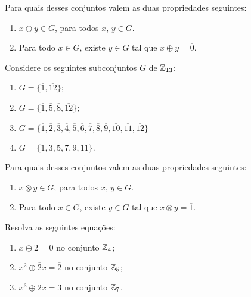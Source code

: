 \documentclass[12pt]{exam}
\begin{document}
    Para quais desses conjuntos valem as duas propriedades seguintes:
    \begin{enumerate}[label=({\roman*})]
        \item $x \oplus y \in G$, para todos $x$, $y \in G$.
        \item Para todo $x \in G$, existe $y \in G$ tal que $x \oplus y = \overline{0}$.
    \end{enumerate}

    \vspace{.3cm}

    \questao{} Considere os seguintes subconjuntos $G$ de $\mathbb{Z}_{13}$:
    \begin{multicols}{2}
        \begin{enumerate}[label=({\alph*})]
            \item $G=\{\overline{1},\overline{12}\}$;

            \item $G=\{\overline{1},\overline{5},\overline{8},\overline{12}\}$;

            \item $G=\{\overline{1},\overline{2},\overline{3},\overline{4}, \overline{5},\overline{6},\overline{7},
            \overline{8},\overline{9},\overline{10},\overline{11},\overline{12}\}$

            \item $G=\{\overline{1}, \overline{3},\overline{5},\overline{7},\overline{9},\overline{11}\}$.
        \end{enumerate}
    \end{multicols}

    Para quais desses conjuntos valem as duas propriedades seguintes:
    \begin{enumerate}[label=({\roman*})]
        \item $x \otimes y \in G$, para todos $x$, $y \in G$.
        \item Para todo $x \in G$, existe $y \in G$ tal que $x \otimes y = \overline{1}$.
    \end{enumerate}

    \vspace{.3cm}

    \questao{} Resolva as seguintes equações:
    \begin{enumerate}[label={\alph*})]
        \item $x \oplus \overline{2} = \overline{0}$ no conjunto $\mathbb{Z}_4$;
        \item $x^2 \oplus \overline{2}x = \overline{2}$ no conjunto $\mathbb{Z}_5$;
        \item $x^3 \oplus \overline{2}x = \overline{3}$ no conjunto $\mathbb{Z}_7$.
    \end{enumerate}
\end{document}
